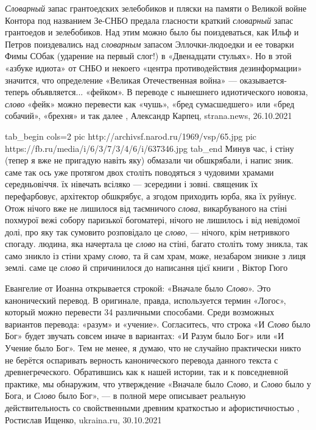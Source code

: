 \emph{Словарный} запас грантоедских зелебобиков и пляски на памяти о Великой войне
Контора под названием Зе-СНБО предала гласности краткий \emph{словарный} запас
грантоедов и зелебобиков. Над этим можно было бы поиздеваться, как Ильф и
Петров поиздевались над \emph{словарным} запасом Эллочки-людоедки и ее товарки Фимы
СОбак (ударение на первый слог!) в «Двенадцати стульях». Но в этой «азбуке
идиота» от СНБО и некоего «центра противодействия дезинформации» значится, что
определение «Великая Отечественная война» — оказывается- теперь объявляется...
«фейком». В переводе с нынешнего идиотического новояза, \emph{слово} «фейк» можно
перевести как «чушь», «бред сумасшедшего» или «бред собачий», «брехня» и так
далее
, 
Александр Карпец, strana.news, 26.10.2021


\ifcmt
  tab_begin cols=2
     pic http://archivsf.narod.ru/1969/vsp/65.jpg
     pic https://fb.ru/media/i/6/3/7/3/4/6/i/637346.jpg
  tab_end
\fi
Минув час, і стіну (тепер я вже не пригадую навіть яку) обмазали чи обшкрябали,
і напис зник. саме так ось уже протягом двох століть поводяться з чудовими
храмами середньовіччя. їх нівечать всіляко — зсередини і зовні.  священик їх
перефарбовує, архітектор обшкрябує, а згодом приходить юрба, яка їх руйнує.
Отож нічого вже не лишилося від таємничого \emph{слова}, викарбуваного на стіні
похмурої вежі собору паризької богоматері, нічого не лишилось і від невідомої
долі, про яку так сумовито розповідало це \emph{слово}, — нічого, крім
нетривкого спогаду. людина, яка начертала це \emph{слово} на стіні, багато
століть тому зникла, так само зникло із стіни храму \emph{слово}, та й сам
храм, може, незабаром зникне з лиця землі. саме це \emph{слово} й спричинилося
до написання цієї книги
, Віктор Гюго

Евангелие от Иоанна открывается строкой: «Вначале было \emph{Слово}». Это
канонический перевод. В оригинале, правда, используется термин «Логос», который
можно перевести 34 различными способами. Среди возможных вариантов перевода:
«разум» и «учение». Согласитесь, что строка «И \emph{Слово} было Бог» будет
звучать совсем иначе в вариантах: «И Разум было Бог» или «И Учение было Бог».
Тем не менее, я думаю, что не случайно практически никто не берётся оспаривать
верность канонического перевода данного текста с древнегреческого. Обратившись
как к нашей истории, так и к повседневной практике, мы обнаружим, что
утверждение «Вначале было \emph{Слово}, и \emph{Слово} было у Бога, и
\emph{Слово} было Бог», — в полной мере описывает реальную действительность со
свойственными древним краткостью и афористичностью
, 
Ростислав Ищенко, ukraina.ru, 30.10.2021


